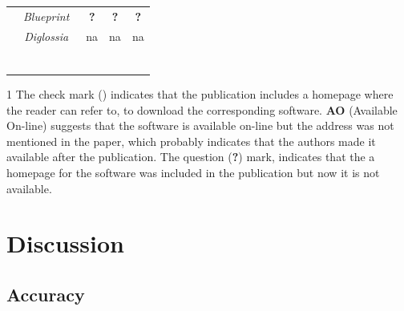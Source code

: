 \documentclass[conference]{IEEEtran}
\makeatletter
\newcommand{\tick}{\ding{52}}
\newcommand{\thickhline}{%
    \noalign {\ifnum 0=`}\fi \hrule height 1pt
    \futurelet \reserved@a \@xhline
}
\makeatother
\begin{document}
\begin{table}
\begin{threeparttable}
\begin{small}
{\begin{tabular}{l|c|ccc}
  &   {\it Blueprint}~\cite{LV09} & {\bf ?} & {\bf ?} & {\bf ?} \\
  &   {\it Diglossia}~\cite{SMS13} & {\sc na} & {\sc na} & {\sc na} \\
  \thickhline
    \end{tabular}}
    \begin{tablenotes}
  \begin{footnotesize}
       \item[1] The check mark (\tick) indicates that the publication
       includes a homepage where the reader can refer to, to
       download the corresponding software. {\bf AO} (Available On-line) suggests
       that the software is available on-line but the
       address was not mentioned in the paper, which probably indicates that
       the authors made it available after the publication. The question ({\bf ?})
       mark, indicates that the a homepage for the software was included
       in the publication but now it is not available.
  \end{footnotesize}
    \end{tablenotes}
    \end{small}
    \end{threeparttable}
\end{table}

\section{Discussion}
\label{sec:discussion}

\subsection{Accuracy}
\end{document}
